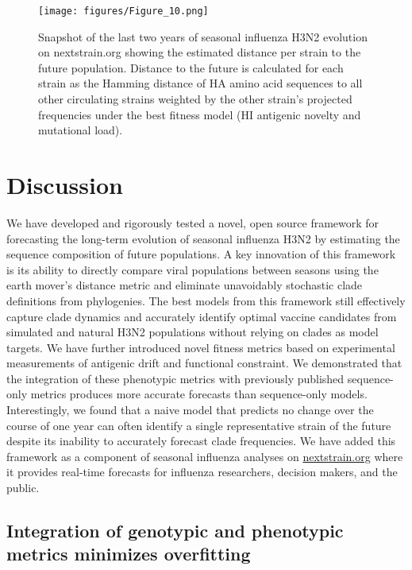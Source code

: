 \begin{figure}[htb]
  \begin{center}
  \texttt{[image: figures/Figure\_10.png]}
  \caption{
    Snapshot of the last two years of seasonal influenza H3N2 evolution on nextstrain.org showing the estimated distance per strain to the future population.
    Distance to the future is calculated for each strain as the Hamming distance of HA amino acid sequences to all other circulating strains weighted by the other strain's projected frequencies under the best fitness model (HI antigenic novelty and mutational load).
  }
  \label{fig:nextstrain_distance_to_future}
  \end{center}
\end{figure}

\section*{Discussion}

We have developed and rigorously tested a novel, open source framework for forecasting the long-term evolution of seasonal influenza H3N2 by estimating the sequence composition of future populations.
A key innovation of this framework is its ability to directly compare viral populations between seasons using the earth mover's distance metric \citep{Rubner1998} and eliminate unavoidably stochastic clade definitions from phylogenies.
The best models from this framework still effectively capture clade dynamics and accurately identify optimal vaccine candidates from simulated and natural H3N2 populations without relying on clades as model targets.
We have further introduced novel fitness metrics based on experimental measurements of antigenic drift and functional constraint.
We demonstrated that the integration of these phenotypic metrics with previously published sequence-only metrics produces more accurate forecasts than sequence-only models.
Interestingly, we found that a naive model that predicts no change over the course of one year can often identify a single representative strain of the future despite its inability to accurately forecast clade frequencies.
We have added this framework as a component of seasonal influenza analyses on \href{https://nextstrain.org/flu}{nextstrain.org} where it provides real-time forecasts for influenza researchers, decision makers, and the public.

\subsection*{Integration of genotypic and phenotypic metrics minimizes overfitting}

